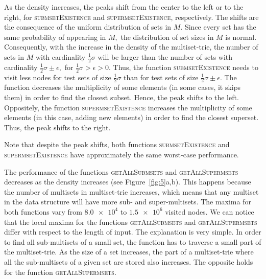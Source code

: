 \documentclass[algorithms,article,accept,pdftex,moreauthors]{Definitions/mdpi}
\begin{document}
As the density increases, the peaks shift from the center to the left or to the right, 
for \textsc{submsetExistence} and \textsc{supermsetExistence}, respectively. 
The shifts are the consequence of the uniform distribution of sets in $M.$ 
Since every set has the same probability of appearing in $M,$ the distribution of set 
sizes in $M$ is normal. Consequently, with the increase in the density of the 
multiset-trie, the number of sets in $M$ with cardinality $\frac{1}{2}\sigma$ will be 
larger than the number of sets with cardinality $\frac{1}{2}\sigma\pm\epsilon,$ 
for $\frac{1}{2}\sigma > \epsilon > 0.$ Thus, the function \textsc{submsetExistence} 
needs to visit less nodes for test sets of size $\frac{1}{2}\sigma$ than for test 
sets of size $\frac{1}{2}\sigma\pm\epsilon.$ The function decreases the 
multiplicity of some elements (in some cases, it skips them) in order to find the 
closest subset. Hence, the peak shifts to the left. Oppositely, the function 
\textsc{supermsetExistence} increases the multiplicity of some elements 
(in this case, adding new elements) in order to find the closest superset. 
Thus, the peak shifts to the right.

Note that despite the peak shifts, both functions \textsc{submsetExistence} and 
\textsc{supermsetExistence} have approximately the same worst-case performance. 

The performance of the functions \textsc{getAllSubmsets} and \textsc{getAllSupermsets} 
decreases as the density increases (see Figure~\ref{fig:5}a,b). 
This happens because the number of multisets in multiset-trie increases, which means 
that any multiset in the data structure will have more sub- and super-multisets. 
The maxima for both functions vary from $\num{8.0e4}$ to $\num{1.5e6}$ visited nodes. 
We can notice that the local maxima for the functions \textsc{getAllSubmsets} and 
\textsc{getAllSupermsets} differ with respect to the length of input. The 
explanation is very simple. In order to find all sub-multisets of a small set, the 
function has to traverse a small part of the multiset-trie. As the size of a set 
increases, the part of a multiset-trie where all the sub-multisets of a given set 
are stored also increases. The opposite holds for the function 
\textsc{getAllSupermsets}.
\end{document}
